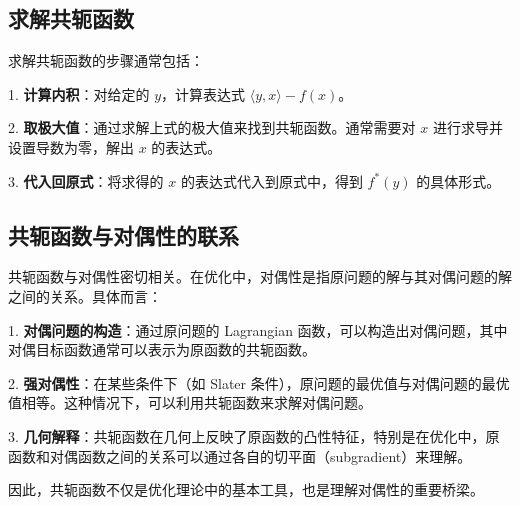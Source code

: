 \documentclass[a4paper]{article}
\begin{document}
\subsection{求解共轭函数}

求解共轭函数的步骤通常包括：

1. \textbf{计算内积}：对给定的 $y$，计算表达式 $ \langle y, x \rangle - f(x) $。

2. \textbf{取极大值}：通过求解上式的极大值来找到共轭函数。通常需要对 $x$ 进行求导并设置导数为零，解出 $x$ 的表达式。

3. \textbf{代入回原式}：将求得的 $x$ 的表达式代入到原式中，得到 $f^*(y)$ 的具体形式。

\subsection{共轭函数与对偶性的联系}

共轭函数与对偶性密切相关。在优化中，对偶性是指原问题的解与其对偶问题的解之间的关系。具体而言：

1. \textbf{对偶问题的构造}：通过原问题的 Lagrangian 函数，可以构造出对偶问题，其中对偶目标函数通常可以表示为原函数的共轭函数。

2. \textbf{强对偶性}：在某些条件下（如 Slater 条件），原问题的最优值与对偶问题的最优值相等。这种情况下，可以利用共轭函数来求解对偶问题。

3. \textbf{几何解释}：共轭函数在几何上反映了原函数的凸性特征，特别是在优化中，原函数和对偶函数之间的关系可以通过各自的切平面（subgradient）来理解。

因此，共轭函数不仅是优化理论中的基本工具，也是理解对偶性的重要桥梁。
\end{document}
